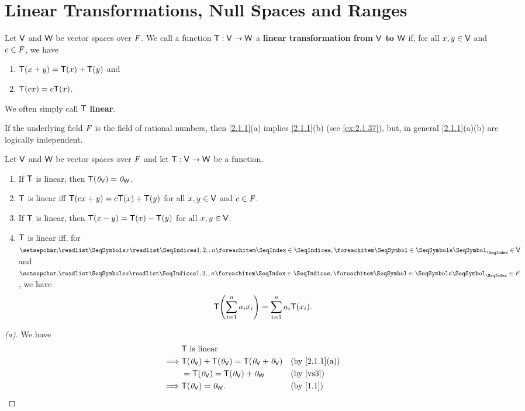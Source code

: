 \section{Linear Transformations, Null Spaces and Ranges}\label{sec:2.1}

\begin{defn}\label{2.1.1}
	Let \(\mathsf{V}\) and \(\mathsf{W}\) be vector spaces over \(\mathit{F}\).
	We call a function \(\mathsf{T} : \mathsf{V} \to \mathsf{W}\) a \textbf{linear transformation from \(\mathsf{V}\) to \(\mathsf{W}\)} if, for all \(x, y \in \mathsf{V}\) and \(c \in \mathit{F}\), we have
	\begin{enumerate}
		\item \(\mathsf{T}(x + y) = \mathsf{T}(x) + \mathsf{T}(y)\) and
		\item \(\mathsf{T}(cx) = c\mathsf{T}(x)\).
	\end{enumerate}
	We often simply call \(\mathsf{T}\) \textbf{linear}.
\end{defn}

\begin{note}
	If the underlying field \(\mathit{F}\) is the field of rational numbers, then \cref{2.1.1}(a) implies \cref{2.1.1}(b) (see \cref{ex:2.1.37}), but, in general \cref{2.1.1}(a)(b) are logically independent.
\end{note}

\begin{prop}\label{2.1.2}
	Let \(\mathsf{V}\) and \(\mathsf{W}\) be vector spaces over \(\mathit{F}\) and let \(\mathsf{T} : \mathsf{V} \to \mathsf{W}\) be a function.
	\begin{enumerate}
		\item If \(\mathsf{T}\) is linear, then \(\mathsf{T}(\mathit{0}_{\mathsf{V}}) = \mathit{0}_{\mathsf{W}}\).
		\item \(\mathsf{T}\) is linear iff \(\mathsf{T}(cx + y) = c\mathsf{T}(x) + \mathsf{T}(y)\) for all \(x, y \in \mathsf{V}\) and \(c \in \mathit{F}\).
		\item If \(\mathsf{T}\) is linear, then \(\mathsf{T}(x - y) = \mathsf{T}(x) - \mathsf{T}(y)\) for all \(x, y \in \mathsf{V}\).
		\item \(\mathsf{T}\) is linear iff, for \(\seq{x}{1,2,,n} \in \V\) and \(\seq{a}{1,2,,n} \in F\), we have
		      \[
			      \T\pa{\sum_{i = 1}^n a_i x_i} = \sum_{i = 1}^n a_i \T(x_i).
		      \]
	\end{enumerate}
\end{prop}

\begin{proof}[(a)]
	We have
	\begin{align*}
		         & \T \text{ is linear}                                                             \\
		\implies & \T(\zv_{\V}) + \T(\zv_{\V}) = \T(\zv_{\V} + \zv_{\V}) &  & \by{2.1.1}[a]         \\
		         & = \T(\zv_{\V}) = \T(\zv_{\V}) + \zv_{\W}              &  & \text{(by \ref{vs3})} \\
		\implies & \T(\zv_{\V}) = \zv_{\W}.                              &  & \by{1.1}
	\end{align*}
\end{proof}

